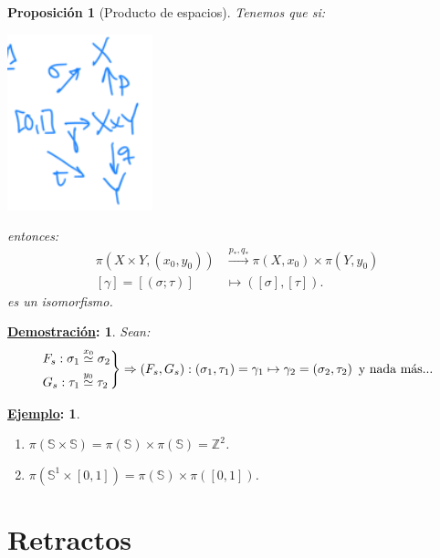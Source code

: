 \documentclass[10pt,a4paper,openright]{book}
\theoremstyle{break}
\newtheorem*{prop}{Proposición}
\newtheorem*{demo}{\underline{Demostración}:}
\newtheorem*{ej}{\underline{Ejemplo}:}
\begin{document}
\begin{prop}[Producto de espacios]
Tenemos que si:
\begin{center}
    \includegraphics[scale=0.3]{images/prod_espacios_funt} 
\end{center} 
entonces:
\begin{align*}
    \pi\left( X \times Y, \left( x_0, y_0 \right) \right) &\xrightarrow{p_*, q_*} \pi\left( X, x_0 \right) \times \pi \left( Y, y_0 \right)\\
    \left[ \gamma \right] = \left[ \left( \sigma; \tau \right) \right] &\mapsto \left( \left[ \sigma \right], \left[ \tau \right] \right)
.\end{align*}
es un isomorfismo.
\end{prop}
\begin{demo}
Sean:
\[
\begin{rcases}
    F_s: \sigma_1 \stackrel{x_0}{\simeq} \sigma_2\\
    G_s: \tau_1 \stackrel{y_0}{\simeq} \tau_2
\end{rcases} \Rightarrow \left( F_s, G_s \right): \left( \sigma_1, \tau_1 \right) = \gamma_1 \mapsto \gamma_2 = \left( \sigma_2, \tau_2 \right) \text{ y nada más...} 
\]
\end{demo}

\begin{ej}
\begin{enumerate}
    \item $\pi\left( \mathbb{S} \times \mathbb{S} \right) = \pi\left( \mathbb{S} \right) \times \pi\left( \mathbb{S} \right) = \mathbb{Z}^2$.
    \item $\pi\left( \mathbb{S}^1 \times \left[ 0, 1 \right] \right) = \pi\left( \mathbb{S} \right) \times \pi\left( \left[ 0, 1 \right] \right)$.
\end{enumerate}
\end{ej}

\chapter{Retractos}%
\label{cha:retractos}
\end{document}

